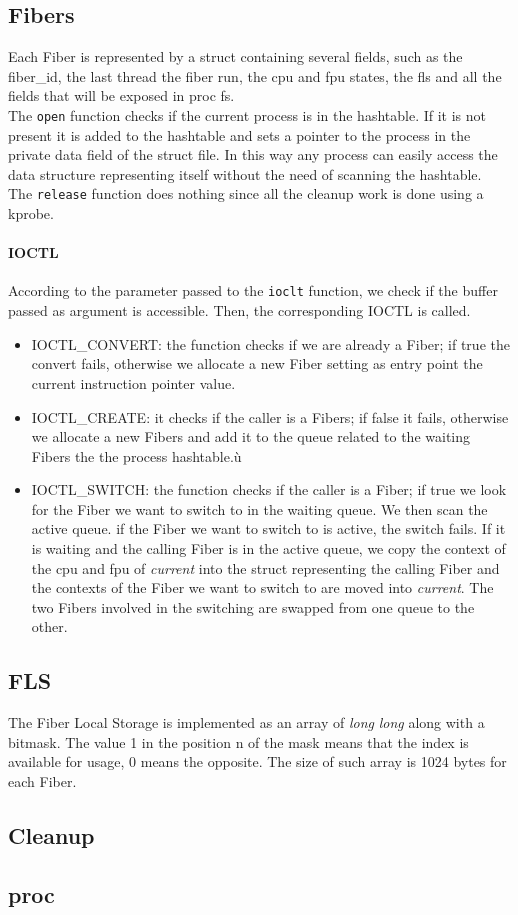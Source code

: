 \documentclass[11pt]{article}
\begin{document}
\subsection{Fibers}
Each Fiber is represented by a struct containing several fields, such as the fiber\_id, the last thread the fiber run, the cpu and fpu states, the fls and all the fields that will be exposed in proc fs.\\
The \texttt{open} function checks if the current process is in the hashtable. If it is not present it is added to the hashtable and sets a pointer to the process in the private data field of the struct file. In this way any process can easily access the data structure representing itself without the need of scanning the hashtable.\\
The \texttt{release} function does nothing since all the cleanup work is done using a kprobe.\\
\paragraph{IOCTL}
According to the parameter passed to the \texttt{ioclt} function, we check if the buffer passed as argument is accessible. Then, the corresponding IOCTL is called.
\begin{itemize}
\item IOCTL\_CONVERT: the function checks if we are already a Fiber; if true the convert fails, otherwise we allocate a new Fiber setting as entry point the current instruction pointer value.
\item IOCTL\_CREATE: it checks if the caller is a Fibers; if false it fails, otherwise we allocate a new Fibers and add it to the queue related to the waiting Fibers the the process hashtable.ù
\item IOCTL\_SWITCH: the function checks if the caller is a Fiber; if true we look for the Fiber we want to switch to in the waiting queue. We then scan the active queue. if the Fiber we want to switch to is active, the switch fails. If it is waiting and the calling Fiber is in the active queue, we copy the context of the cpu and fpu of \textit{current} into the struct representing the calling Fiber and the contexts of the Fiber we want to switch to are moved into \textit{current}. The two Fibers involved in the switching are swapped from one queue to the other.
\end{itemize}

\subsection{FLS}
The Fiber Local Storage is implemented as an array of \textit{long} \textit{long} along with a bitmask. The value 1 in the position n of the mask means that the index is available for usage, 0 means the opposite. The size of such array is 1024 bytes for each Fiber.
\subsection{Cleanup}
\subsection{proc}
\end{document}
